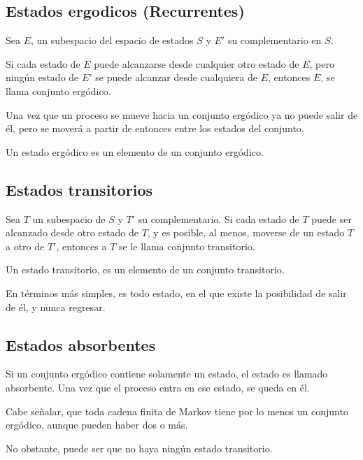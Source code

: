 \documentclass{article}
\begin{document}
\subsection*{Estados ergodicos (Recurrentes)}

Sea \( E \), un subespacio del espacio de estados \( S \) y \( E' \) su complementario en \( S \).

Si cada estado de \( E \) puede alcanzarse desde cualquier otro estado de \( E \), pero ningún estado de \( E' \) se puede alcanzar desde cualquiera de \( E \), entonces \( E \), se llama conjunto ergódico.

Una vez que un proceso se mueve hacia un conjunto ergódico ya no puede salir de él, pero se moverá a partir de entonces entre los estados del conjunto.

Un estado ergódico es un elemento de un conjunto ergódico.

\subsection*{Estados transitorios}

Sea \( T \) un subespacio de \( S \) y \( T' \) su complementario. Si cada estado de \( T \) puede ser alcanzado desde otro estado de \( T \), y es posible, al menos, moverse de un estado \( T \) a otro de \( T' \), entonces a \( T \) se le llama conjunto transitorio.

Un estado transitorio, es un elemento de un conjunto transitorio.

En términos más simples, es todo estado, en el que existe la posibilidad de salir de él, y nunca regresar.

\subsection*{Estados absorbentes}

Si un conjunto ergódico contiene solamente un estado, el estado es llamado absorbente. Una vez que el proceso entra en ese estado, se queda en él.

Cabe señalar, que toda cadena finita de Markov tiene por lo menos un conjunto ergódico, aunque pueden haber dos o más.

No obstante, puede ser que no haya ningún estado transitorio.
\end{document}
